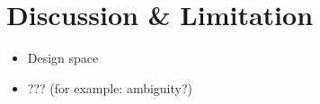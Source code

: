 \section{Discussion \& Limitation}

\begin{itemize}
	\item Design space
	\item ??? (for example: ambiguity?)
\end{itemize}